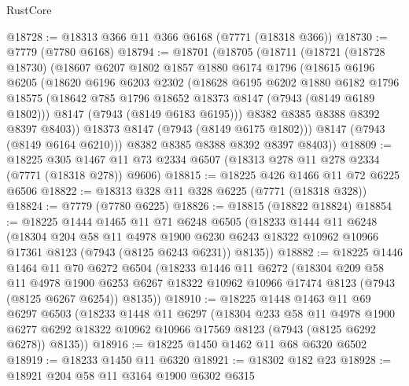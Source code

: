 \begin{lexlean}{RustCore}
\begin{coremodule}
@18728 := @18313 @366 @11 @366 @6168 (@7771 (@18318 @366))
@18730 := @7779 (@7780 @6168)
@18794 := @18701
    (@18705
      (@18711
        (@18721
          (@18728 @18730)
          (@18607
            @6207
            @1802
            @1857
            @1880
            @6174
            @1796
            (@18615
              @6196
              @6205
              (@18620
                @6196
                @6203
                @2302
                (@18628
                  @6195
                  @6202
                  @1880
                  @6182
                  @1796
                  @18575
                  (@18642 @785 @1796 @18652 @18373 @8147 (@7943 (@8149 @6189 @1802)))
                  @8147
                  (@7943 (@8149 @6183 @6195)))
                @8382
                @8385
                @8388
                @8392
                @8397
                @8403))
            @18373
            @8147
            (@7943 (@8149 @6175 @1802)))
          @8147
          (@7943 (@8149 @6164 @6210)))
        @8382
        @8385
        @8388
        @8392
        @8397
        @8403))
@18809 := @18225
    @305
    @1467
    @11
    @73
    @2334
    @6507
    (@18313 @278 @11 @278 @2334 (@7771 (@18318 @278)) @9606)
@18815 := @18225 @426 @1466 @11 @72 @6225 @6506
@18822 := @18313 @328 @11 @328 @6225 (@7771 (@18318 @328))
@18824 := @7779 (@7780 @6225)
@18826 := @18815 (@18822 @18824)
@18854 := @18225
    @1444
    @1465
    @11
    @71
    @6248
    @6505
    (@18233
      @1444
      @11
      @6248
      (@18304
        @204
        @58
        @11
        @4978
        @1900
        @6230
        @6243
        @18322
        @10962
        @10966
        @17361
        @8123
        (@7943 (@8125 @6243 @6231))
        @8135))
@18882 := @18225
    @1446
    @1464
    @11
    @70
    @6272
    @6504
    (@18233
      @1446
      @11
      @6272
      (@18304
        @209
        @58
        @11
        @4978
        @1900
        @6253
        @6267
        @18322
        @10962
        @10966
        @17474
        @8123
        (@7943 (@8125 @6267 @6254))
        @8135))
@18910 := @18225
    @1448
    @1463
    @11
    @69
    @6297
    @6503
    (@18233
      @1448
      @11
      @6297
      (@18304
        @233
        @58
        @11
        @4978
        @1900
        @6277
        @6292
        @18322
        @10962
        @10966
        @17569
        @8123
        (@7943 (@8125 @6292 @6278))
        @8135))
@18916 := @18225 @1450 @1462 @11 @68 @6320 @6502
@18919 := @18233 @1450 @11 @6320
@18921 := @18302 @182 @23
@18928 := @18921 @204 @58 @11 @3164 @1900 @6302 @6315

\end{coremodule}
\end{lexlean}
